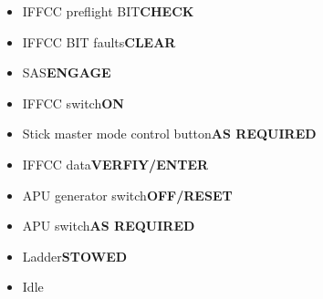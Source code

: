 \documentclass[a4paper,12pt,dvipsnames]{letter}
\newcommand{\button}[1]{\textbf{#1}}
\begin{document}
{\begin{itemize}
\begin{itemize}
  \item SAI\dotfill\button{UNCAGE}
  \item VVI\dotfill\button{ZERO}
  \item Airspeed indicator\dotfill\button{CHECK}
 \end{itemize}
 \item IFFCC preflight BIT\dotfill\button{CHECK}
 \item IFFCC BIT faults\dotfill\button{CLEAR}
 \item SAS\dotfill\button{ENGAGE}
 \item IFFCC switch\dotfill\button{ON}
 \item Stick master mode control button\dotfill\button{AS REQUIRED}
 \item IFFCC data\dotfill\button{VERFIY/ENTER}
 \item APU generator switch\dotfill\button{OFF/RESET}
 \item APU switch\dotfill\button{AS REQUIRED}
 \item Ladder\dotfill\button{STOWED}
 \item Idle
\end{itemize}
}
\end{document}
